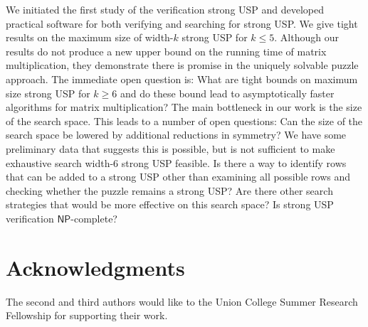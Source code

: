 \documentclass[11pt]{article}
\renewcommand\NP{\ensuremath{\mathsf{NP}}}
\begin{document}
We initiated the first study of the verification strong USP and
developed practical software for both verifying and searching for
strong USP.  We give tight results on the maximum size of width-$k$
strong USP for $k \le 5$.  Although our results do not produce a new
upper bound on the running time of matrix multiplication, they
demonstrate there is promise in the uniquely solvable puzzle approach.
The immediate open question is: What are tight bounds on maximum size
strong USP for $k \ge 6$ and do these bound lead to asymptotically
faster algorithms for matrix multiplication?  The main bottleneck in
our work is the size of the search space.  This leads to a number of
open questions: Can the size of the search space be lowered by
additional reductions in symmetry?  We have some preliminary data that
suggests this is possible, but is not sufficient to make exhaustive
search width-6 strong USP feasible.  Is there a way to identify rows
that can be added to a strong USP other than examining all possible
rows and checking whether the puzzle remains a strong USP?  Are there
other search strategies that would be more effective on this search
space?  Is strong USP verification \NP-complete?

\section{Acknowledgments}

The second and third authors would like to the Union College
Summer Research Fellowship for supporting their work.

 

\appendix
\end{document}
